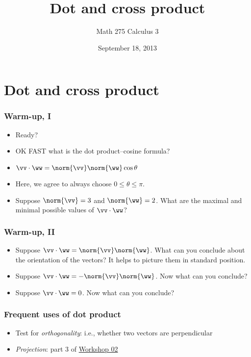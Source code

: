 \documentclass[11pt,ignorenonframetext,xcolor={svgnames},aspectratio=169]{beamer}
\title{Dot and cross product}
\author{Math 275 Calculus 3}
\date{September 18, 2013 }
\begin{document}
\frame{\titlepage}

\section{Dot and cross product}

\begin{frame}\frametitle{Warm-up, I}

\begin{itemize}
\item
  Ready?
  \pause
\item
  OK FAST what is the dot product--cosine formula?
  \pause
\item
  $\vv \cdot \ww = \norm{\vv} \norm{\ww} \cos{\theta}$
  \pause
\item
  Here, we agree to always choose $0 \leq \theta \leq \pi$.
  \pause
\item
  Suppose $\norm{\vv} = 3$ and $\norm{\ww} = 2$. What are the maximal
  and minimal possible values of $\vv \cdot \ww$?
\end{itemize}

\end{frame}

\begin{frame}\frametitle{Warm-up, II}

\begin{itemize}
\item
  Suppose $\vv \cdot \ww = \norm{\vv} \norm{\ww}$. What can you conclude
  about the orientation of the vectors? It helps to picture them in
  standard position.
  \pause
\item
  Suppose $\vv \cdot \ww = -\norm{\vv} \norm{\ww}$. Now what can you
  conclude?
  \pause
\item
  Suppose $\vv \cdot \ww = 0$. Now what can you conclude?
\end{itemize}

\end{frame}

\begin{frame}\frametitle{Frequent uses of dot product}

\begin{itemize}

\item
  Test for \emph{orthogonality}: i.e., whether two vectors are
  perpendicular
\item
  \emph{Projection}: part 3 of
  \href{../../workshops/02/Workshop.pdf}{Workshop 02}
\end{itemize}

\end{frame}
\end{document}

